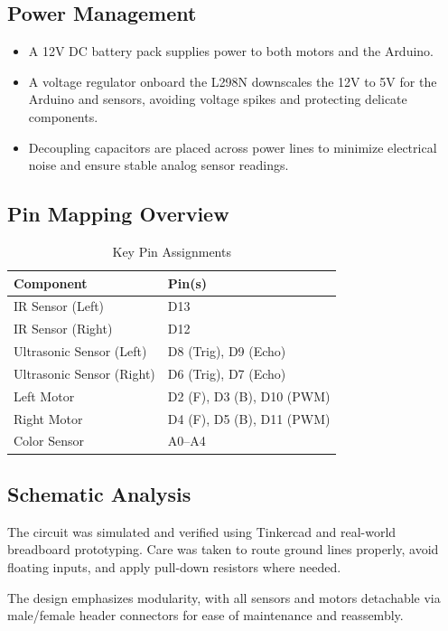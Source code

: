 \documentclass[conference]{IEEEtran}
\begin{document}
\subsection{Power Management}
\begin{itemize}
  \item A 12V DC battery pack supplies power to both motors and the Arduino.
  \item A voltage regulator onboard the L298N downscales the 12V to 5V for the Arduino and sensors, avoiding voltage spikes and protecting delicate components.
  \item Decoupling capacitors are placed across power lines to minimize electrical noise and ensure stable analog sensor readings.
\end{itemize}

\subsection{Pin Mapping Overview}

\begin{table}[H]
\centering
\caption{Key Pin Assignments}
\label{tab:pinmap}
\begin{tabular}{|l|l|}
\hline
\textbf{Component} & \textbf{Pin(s)} \\ \hline
IR Sensor (Left) & D13 \\ \hline
IR Sensor (Right) & D12 \\ \hline
Ultrasonic Sensor (Left) & D8 (Trig), D9 (Echo) \\ \hline
Ultrasonic Sensor (Right) & D6 (Trig), D7 (Echo) \\ \hline
Left Motor & D2 (F), D3 (B), D10 (PWM) \\ \hline
Right Motor & D4 (F), D5 (B), D11 (PWM) \\ \hline
Color Sensor & A0–A4 \\ \hline
\end{tabular}
\end{table}

\subsection{Schematic Analysis}
The circuit was simulated and verified using Tinkercad and real-world breadboard prototyping. Care was taken to route ground lines properly, avoid floating inputs, and apply pull-down resistors where needed.

The design emphasizes modularity, with all sensors and motors detachable via male/female header connectors for ease of maintenance and reassembly.
\end{document}
